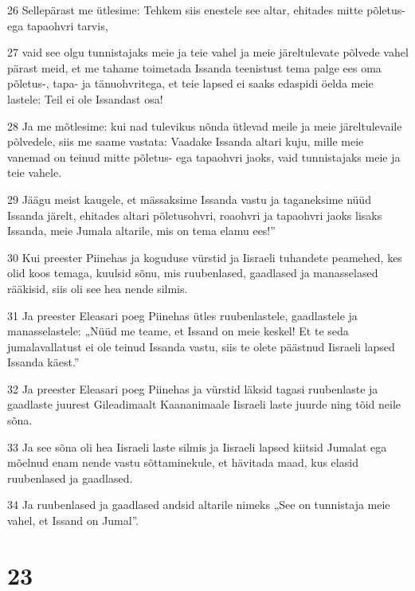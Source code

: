 \par 26 Sellepärast me ütlesime: Tehkem siis enestele see altar, ehitades mitte põletus- ega tapaohvri tarvis,
\par 27 vaid see olgu tunnistajaks meie ja teie vahel ja meie järeltulevate põlvede vahel pärast meid, et me tahame toimetada Issanda teenistust tema palge ees oma põletus-, tapa- ja tänuohvritega, et teie lapsed ei saaks edaspidi öelda meie lastele: Teil ei ole Issandast osa!
\par 28 Ja me mõtlesime: kui nad tulevikus nõnda ütlevad meile ja meie järeltulevaile põlvedele, siis me saame vastata: Vaadake Issanda altari kuju, mille meie vanemad on teinud mitte põletus- ega tapaohvri jaoks, vaid tunnistajaks meie ja teie vahele.
\par 29 Jäägu meist kaugele, et mässaksime Issanda vastu ja taganeksime nüüd Issanda järelt, ehitades altari põletusohvri, roaohvri ja tapaohvri jaoks lisaks Issanda, meie Jumala altarile, mis on tema elamu ees!”
\par 30 Kui preester Piinehas ja koguduse vürstid ja Iisraeli tuhandete peamehed, kes olid koos temaga, kuulsid sõnu, mis ruubenlased, gaadlased ja manasselased rääkisid, siis oli see hea nende silmis.
\par 31 Ja preester Eleasari poeg Piinehas ütles ruubenlastele, gaadlastele ja manasselastele: „Nüüd me teame, et Issand on meie keskel! Et te seda jumalavallatust ei ole teinud Issanda vastu, siis te olete päästnud Iisraeli lapsed Issanda käest.”
\par 32 Ja preester Eleasari poeg Piinehas ja vürstid läksid tagasi ruubenlaste ja gaadlaste juurest Gileadimaalt Kaananimaale Iisraeli laste juurde ning tõid neile sõna.
\par 33 Ja see sõna oli hea Iisraeli laste silmis ja Iisraeli lapsed kiitsid Jumalat ega mõelnud enam nende vastu sõttaminekule, et hävitada maad, kus elasid ruubenlased ja gaadlased.
\par 34 Ja ruubenlased ja gaadlased andsid altarile nimeks „See on tunnistaja meie vahel, et Issand on Jumal”.

\chapter{23}

